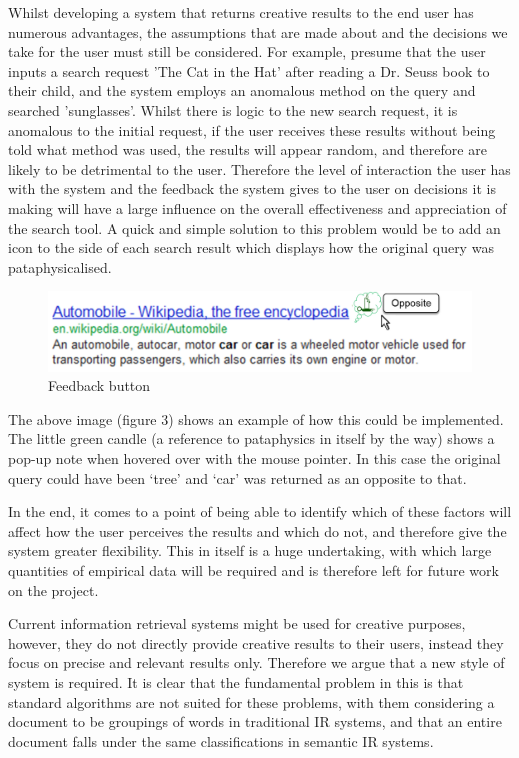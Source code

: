 Whilst developing a system that returns creative results to the end user has numerous advantages, the assumptions that are made about and the decisions we take for the user must still be considered. For example, presume that the user inputs a search request 'The Cat in the Hat' after reading a Dr. Seuss book to their child, and the system employs an anomalous method on the query and searched 'sunglasses'. Whilst there is logic to the new search request, it is anomalous to the initial request, if the user receives these results without being told what method was used, the results will appear random, and therefore are likely to be detrimental to the user. Therefore the level of interaction the user has with the system and the feedback the system gives to the user on decisions it is making will have a large influence on the overall effectiveness and appreciation of the search tool. A quick and simple solution to this problem would be to add an icon to the side of each search result which displays how the original query was pataphysicalised.

\begin{figure}[!htb] %
  \centering
  \includegraphics[width=\textwidth]{images/resultexample}
\caption[Feedback button]{Feedback button}
\label{fig:feedback}
\end{figure}

The above image (figure 3) shows an example of how this could be implemented. The little green candle (a reference to pataphysics in itself by the way) shows a pop-up note when hovered over with the mouse pointer. In this case the original query could have been ‘tree’ and ‘car’ was returned as an opposite to that.

In the end, it comes to a point of being able to identify which of these factors will affect how the user perceives the results and which do not, and therefore give the system greater flexibility. This in itself is a huge undertaking, with which large quantities of empirical data will be required and is therefore left for future work on the project.

Current information retrieval systems might be used for creative purposes, however, they do not directly provide creative results to their users, instead they focus on precise and relevant results only. Therefore we argue that a new style of system is required. It is clear that the fundamental problem in this is that standard algorithms are not suited for these problems, with them considering a document to be groupings of words in traditional IR systems, and that an entire document falls under the same classifications in semantic IR systems.

